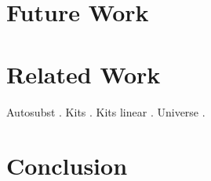 \documentclass[sigplan,10pt]{acmart}
\begin{document}
  \section{Future Work}

  \section{Related Work}
  Autosubst \cite{DBLP:conf/cpp/StarkSK19, DBLP:conf/itp/SchaferTS15}.
  Kits \cite{DBLP:journals/jar/BentonHKM12, unpublished:mcbride2005kits}.
  Kits linear \cite{DBLP:journals/corr/abs-2005-02247}.
  Universe \cite{DBLP:journals/pacmpl/AllaisA0MM18}.

  \section{Conclusion}

  

  \clearpage
  \appendix
\end{document}
